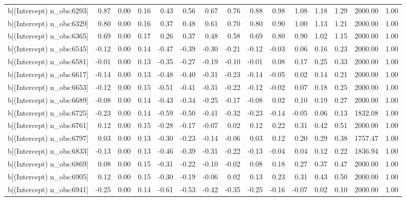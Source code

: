 \begin{table}[ht]
\begin{tabular}{rrrrrrrrrrrrrrr}
  b[(Intercept) n\_obs:6293] & 0.87 & 0.00 & 0.16 & 0.43 & 0.56 & 0.67 & 0.76 & 0.88 & 0.98 & 1.08 & 1.18 & 1.29 & 2000.00 & 1.00 \\ 
  b[(Intercept) n\_obs:6329] & 0.80 & 0.00 & 0.16 & 0.37 & 0.48 & 0.61 & 0.70 & 0.80 & 0.90 & 1.00 & 1.13 & 1.21 & 2000.00 & 1.00 \\ 
  b[(Intercept) n\_obs:6365] & 0.69 & 0.00 & 0.17 & 0.26 & 0.37 & 0.48 & 0.58 & 0.69 & 0.80 & 0.90 & 1.02 & 1.15 & 2000.00 & 1.00 \\ 
  b[(Intercept) n\_obs:6545] & -0.12 & 0.00 & 0.14 & -0.47 & -0.39 & -0.30 & -0.21 & -0.12 & -0.03 & 0.06 & 0.16 & 0.23 & 2000.00 & 1.00 \\ 
  b[(Intercept) n\_obs:6581] & -0.01 & 0.00 & 0.13 & -0.35 & -0.27 & -0.19 & -0.10 & -0.01 & 0.08 & 0.17 & 0.25 & 0.33 & 2000.00 & 1.00 \\ 
  b[(Intercept) n\_obs:6617] & -0.14 & 0.00 & 0.13 & -0.48 & -0.40 & -0.31 & -0.23 & -0.14 & -0.05 & 0.02 & 0.14 & 0.21 & 2000.00 & 1.00 \\ 
  b[(Intercept) n\_obs:6653] & -0.12 & 0.00 & 0.15 & -0.51 & -0.41 & -0.31 & -0.22 & -0.12 & -0.02 & 0.07 & 0.18 & 0.25 & 2000.00 & 1.00 \\ 
  b[(Intercept) n\_obs:6689] & -0.08 & 0.00 & 0.14 & -0.43 & -0.34 & -0.25 & -0.17 & -0.08 & 0.02 & 0.10 & 0.19 & 0.27 & 2000.00 & 1.00 \\ 
  b[(Intercept) n\_obs:6725] & -0.23 & 0.00 & 0.14 & -0.59 & -0.50 & -0.41 & -0.32 & -0.23 & -0.14 & -0.05 & 0.06 & 0.13 & 1832.08 & 1.00 \\ 
  b[(Intercept) n\_obs:6761] & 0.12 & 0.00 & 0.15 & -0.28 & -0.17 & -0.07 & 0.02 & 0.12 & 0.22 & 0.31 & 0.42 & 0.51 & 2000.00 & 1.00 \\ 
  b[(Intercept) n\_obs:6797] & 0.03 & 0.00 & 0.13 & -0.30 & -0.23 & -0.14 & -0.06 & 0.03 & 0.12 & 0.20 & 0.29 & 0.38 & 1757.47 & 1.00 \\ 
  b[(Intercept) n\_obs:6833] & -0.13 & 0.00 & 0.13 & -0.46 & -0.39 & -0.31 & -0.22 & -0.13 & -0.04 & 0.04 & 0.12 & 0.22 & 1836.94 & 1.00 \\ 
  b[(Intercept) n\_obs:6869] & 0.08 & 0.00 & 0.15 & -0.31 & -0.22 & -0.10 & -0.02 & 0.08 & 0.18 & 0.27 & 0.37 & 0.47 & 2000.00 & 1.00 \\ 
  b[(Intercept) n\_obs:6905] & 0.12 & 0.00 & 0.15 & -0.30 & -0.19 & -0.06 & 0.02 & 0.13 & 0.23 & 0.31 & 0.43 & 0.50 & 2000.00 & 1.00 \\ 
  b[(Intercept) n\_obs:6941] & -0.25 & 0.00 & 0.14 & -0.61 & -0.53 & -0.42 & -0.35 & -0.25 & -0.16 & -0.07 & 0.02 & 0.10 & 2000.00 & 1.00 \\ 

\end{tabular}
\end{table}
